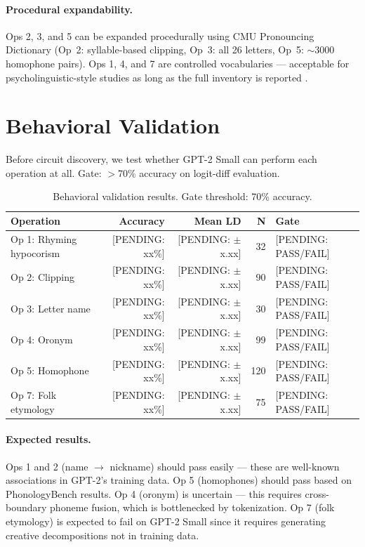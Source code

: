 \documentclass{article}
\newcommand{\PENDING}[1]{{\color{blue}[PENDING: #1]}}
\begin{document}
\paragraph{Procedural expandability.}
Ops 2, 3, and 5 can be expanded procedurally using CMU Pronouncing Dictionary
(Op~2: syllable-based clipping, Op~3: all 26 letters, Op~5: $\sim$3000
homophone pairs). Ops 1, 4, and 7 are controlled vocabularies --- acceptable
for psycholinguistic-style studies as long as the full inventory is reported
\citep{warstadt2020blimp}.

\section{Behavioral Validation}

Before circuit discovery, we test whether GPT-2 Small can perform each
operation at all. Gate: $>$70\% accuracy on logit-diff evaluation.

\begin{table}[h!]
\centering
\caption{Behavioral validation results. Gate threshold: 70\% accuracy.}
\label{tab:behavioral}
\small
\begin{tabular}{lrrrl}
\toprule
\textbf{Operation} & \textbf{Accuracy} & \textbf{Mean LD} & \textbf{N} & \textbf{Gate} \\
\midrule
Op 1: Rhyming hypocorism   & \PENDING{xx\%} & \PENDING{$\pm$x.xx} & 32  & \PENDING{PASS/FAIL} \\
Op 2: Clipping             & \PENDING{xx\%} & \PENDING{$\pm$x.xx} & 90  & \PENDING{PASS/FAIL} \\
Op 3: Letter name          & \PENDING{xx\%} & \PENDING{$\pm$x.xx} & 30  & \PENDING{PASS/FAIL} \\
Op 4: Oronym               & \PENDING{xx\%} & \PENDING{$\pm$x.xx} & 99  & \PENDING{PASS/FAIL} \\
Op 5: Homophone            & \PENDING{xx\%} & \PENDING{$\pm$x.xx} & 120 & \PENDING{PASS/FAIL} \\
Op 7: Folk etymology       & \PENDING{xx\%} & \PENDING{$\pm$x.xx} & 75  & \PENDING{PASS/FAIL} \\
\bottomrule
\end{tabular}
\end{table}

\paragraph{Expected results.}
Ops 1 and 2 (name $\to$ nickname) should pass easily --- these are well-known
associations in GPT-2's training data. Op 5 (homophones) should pass based on
PhonologyBench results. Op 4 (oronym) is uncertain --- this requires
cross-boundary phoneme fusion, which is bottlenecked by tokenization. Op 7
(folk etymology) is expected to fail on GPT-2 Small since it requires
generating creative decompositions not in training data.
\end{document}
